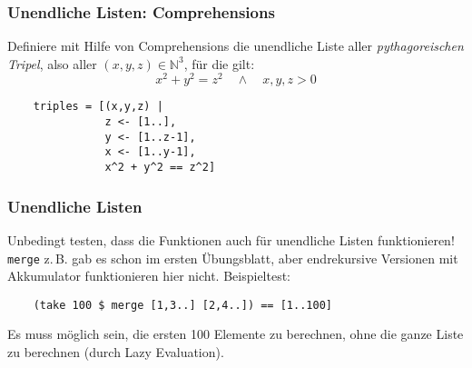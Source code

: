 \documentclass{beamer}
\begin{document}
\begin{frame}[fragile]
  \frametitle{Unendliche Listen: Comprehensions}
  Definiere mit Hilfe von Comprehensions die unendliche Liste aller \emph{pythagoreischen Tripel},
  also aller $(x,y,z) ∈ ℕ^3$, für die gilt:
  \[x^2 + y^2 = z^2 \quad \land \quad x,y,z>0\]
  \pause
  \begin{lstlisting}
    triples = [(x,y,z) |
               z <- [1..],
               y <- [1..z-1],
               x <- [1..y-1],
               x^2 + y^2 == z^2]
  \end{lstlisting}
\end{frame}

\begin{frame}[fragile]
  \frametitle{Unendliche Listen}
  Unbedingt testen, dass die Funktionen auch für unendliche Listen funktionieren!
  \lstinline{merge} z.\,B. gab es schon im ersten Übungsblatt,
  aber endrekursive Versionen mit Akkumulator funktionieren hier nicht.
  Beispieltest:
  \begin{lstlisting}
    (take 100 $ merge [1,3..] [2,4..]) == [1..100]
  \end{lstlisting}
  Es muss möglich sein, die ersten 100 Elemente zu berechnen, ohne die ganze Liste zu berechnen (durch Lazy Evaluation).
\end{frame}
\end{document}
